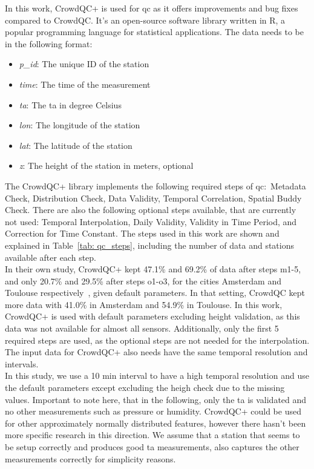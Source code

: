 In this work, CrowdQC+ is used for \gls{qc} as it offers improvements and bug fixes compared to CrowdQC. It's an open-source software library written in R, a popular programming language for statistical applications. The data needs to be in the following format:

\begin{itemize}
    \item \textit{p\_id}: The unique ID of the station
    \item \textit{time}: The time of the measurement
    \item \textit{ta}: The \gls{ta} in degree Celsius
    \item \textit{lon}: The longitude of the station
    \item \textit{lat}: The latitude of the station
    \item \textit{z}: The height of the station in meters, optional
\end{itemize}

The CrowdQC+ library implements the following required steps of \gls{qc}:\ Metadata Check, Distribution Check, Data Validity, Temporal Correlation, Spatial Buddy Check. There are also the following optional steps available, that are currently not used: Temporal Interpolation, Daily Validity, Validity in Time Period, and Correction for Time Constant.
The steps used in this work are shown and explained in Table~\ref{tab: qc_steps}, including the number of data and stations available after each step.\\
In their own study, CrowdQC+ kept 47.1\% and 69.2\% of data after steps m1-5, and only 20.7\% and 29.5\% after steps o1-o3, for the cities Amsterdam and Toulouse respectively~\cite{fenner2021crowdqc+}, given default parameters. In that setting, CrowdQC kept more data with 41.0\% in Amsterdam and 54.9\% in Toulouse. In this work, CrowdQC+ is used with default parameters excluding height validation, as this data was not available for almost all sensors. Additionally, only the first 5 required steps are used, as the optional steps are not needed for the interpolation. The input data for CrowdQC+ also needs have the same temporal resolution and intervals.\\
In this study, we use a 10 min interval to have a high temporal resolution and use the default parameters except excluding the heigh check due to the missing values. Important to note here, that in the following, only the \gls{ta} is validated and no other measurements such as pressure or humidity. CrowdQC+ could be used for other approximately normally distributed features, however there hasn't been more specific research in this direction. We assume that a station that seems to be setup correctly and produces good \gls{ta} measurements, also captures the other measurements correctly for simplicity reasons.

